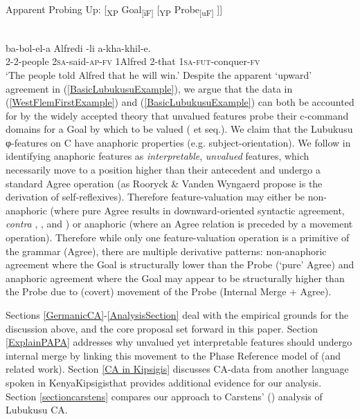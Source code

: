 \ea \label{ProbingUpSchematic}
Apparent Probing Up: [\textsubscript{XP} Goal\textsubscript{[iF]} [\textsubscript{YP} Probe\textsubscript{[uF]} ]]
\z

\ea \label{BasicLubukusuExample}
\\
\gll {}	ba-bol-el-a	Alfredi	-li	a-kha-khil-e.\\
	2-2-people 	2\textsc{sa}-said-\textsc{ap}-\textsc{fv}	1Alfred	2-that	1\textsc{sa}-\textsc{fut}-conquer-\textsc{fv} \\
\glt `The people told Alfred that he will win.'	
\z
\noindent Despite the apparent `upward' agreement in (\ref{BasicLubukusuExample}), we argue that the data in (\ref{WestFlemFirstExample}) and (\ref{BasicLubukusuExample}) can both be accounted for by the widely accepted theory that unvalued features probe their c-command domains for a Goal by which to be valued (\citealt{Chomsky:2000a} et seq.).  We claim that the Lubukusu φ-features on C have anaphoric properties (e.g. subject-orientation). We follow \citet{Rooryck:2011} in identifying anaphoric features as \textit{interpretable}, \textit{unvalued} features, which necessarily move to a position higher than their antecedent and undergo a standard Agree operation (as Rooryck \& Vanden Wyngaerd \citeyear{Rooryck:2011} propose is the derivation of self-reflexives). Therefore feature-valuation may either be non-anaphoric (where pure Agree results in downward-oriented syntactic agreement, \textit{contra} \citealt{Zeijlstra:2012}, \citealt{Wurmbrand:2011}, and \citealt{Bjorkman:toappearb}) or anaphoric (where an Agree relation 
is preceded by a movement operation). Therefore while only one feature-valuation operation is a primitive of the grammar (Agree), there are multiple derivative patterns: non-anaphoric agreement where the Goal is structurally lower than the Probe (`pure' Agree) and anaphoric agreement where the Goal may appear to be structurally higher than the Probe due to (covert) movement of the Probe (Internal Merge + Agree). 

Sections \ref{GermanicCA}-\ref{AnalysisSection} deal with the empirical grounds for the discussion above, and the core proposal set forward in this paper. Section \ref{ExplainPAPA} addresses why unvalued yet interpretable features should undergo internal merge by linking this movement to the Phase Reference model of \citet{Hinzen:2012} (and related work). Section \ref{CA in Kipsigis} discusses CA-data from another language spoken in Kenya\textemdash Kipsigis\textemdash that provides additional evidence for our analysis. Section \ref{sectioncarstens} compares our approach to Carstens' (\citeyear{Carstens:2016}) analysis of Lubukusu CA.

